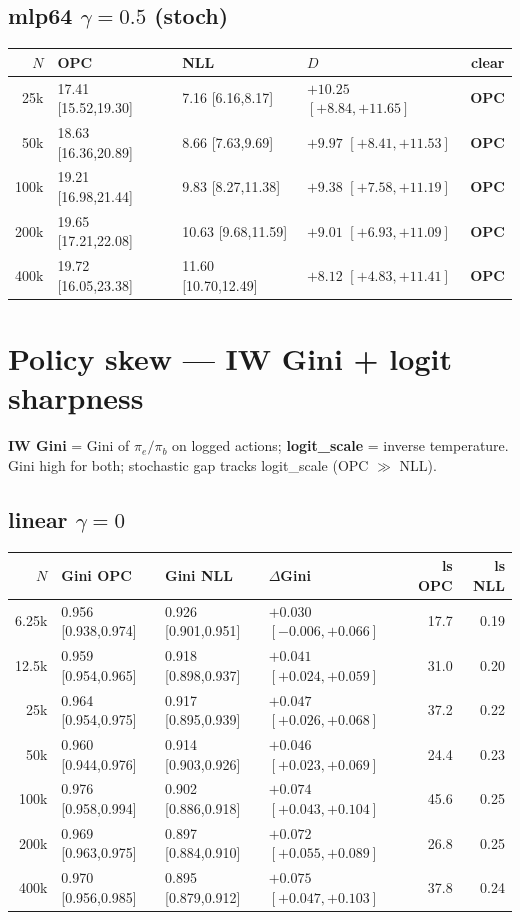 \documentclass[10pt]{article}
\begin{document}
\subsection*{mlp64 $\gamma{=}0.5$ (stoch)}
{\scriptsize
\begin{tabular}{@{}r lll c@{}}
\toprule
$N$ & OPC & NLL & $D$ & clear \\
\midrule
25k & 17.41 [15.52,19.30] & 7.16 [6.16,8.17] & $+10.25$ $[+8.84,+11.65]$ & \textbf{OPC} \\
50k & 18.63 [16.36,20.89] & 8.66 [7.63,9.69] & $+9.97$ $[+8.41,+11.53]$ & \textbf{OPC} \\
100k & 19.21 [16.98,21.44] & 9.83 [8.27,11.38] & $+9.38$ $[+7.58,+11.19]$ & \textbf{OPC} \\
200k & 19.65 [17.21,22.08] & 10.63 [9.68,11.59] & $+9.01$ $[+6.93,+11.09]$ & \textbf{OPC} \\
400k & 19.72 [16.05,23.38] & 11.60 [10.70,12.49] & $+8.12$ $[+4.83,+11.41]$ & \textbf{OPC} \\
\bottomrule
\end{tabular}}

\section*{Policy skew --- IW Gini + logit sharpness}
\textbf{IW Gini} = Gini of $\pi_e/\pi_b$ on logged actions; \textbf{logit\_scale} = inverse temperature.
Gini high for both; stochastic gap tracks logit\_scale (OPC $\gg$ NLL).

\subsection*{linear $\gamma{=}0$}
{\scriptsize
\begin{tabular}{@{}r ll l rr@{}}
\toprule
$N$ & Gini OPC & Gini NLL & $\Delta$Gini & ls OPC & ls NLL \\
\midrule
6.25k & 0.956 [0.938,0.974] & 0.926 [0.901,0.951] & $+0.030$ $[-0.006,+0.066]$ & 17.7 & 0.19 \\
12.5k & 0.959 [0.954,0.965] & 0.918 [0.898,0.937] & $+0.041$ $[+0.024,+0.059]$ & 31.0 & 0.20 \\
25k & 0.964 [0.954,0.975] & 0.917 [0.895,0.939] & $+0.047$ $[+0.026,+0.068]$ & 37.2 & 0.22 \\
50k & 0.960 [0.944,0.976] & 0.914 [0.903,0.926] & $+0.046$ $[+0.023,+0.069]$ & 24.4 & 0.23 \\
100k & 0.976 [0.958,0.994] & 0.902 [0.886,0.918] & $+0.074$ $[+0.043,+0.104]$ & 45.6 & 0.25 \\
200k & 0.969 [0.963,0.975] & 0.897 [0.884,0.910] & $+0.072$ $[+0.055,+0.089]$ & 26.8 & 0.25 \\
400k & 0.970 [0.956,0.985] & 0.895 [0.879,0.912] & $+0.075$ $[+0.047,+0.103]$ & 37.8 & 0.24 \\
\bottomrule
\end{tabular}}
\end{document}
